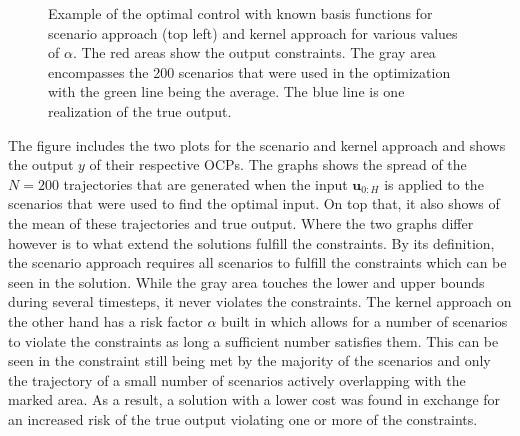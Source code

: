 \begin{figure}[htb]
{		\centering
 } 


\caption{Example of the optimal control with known basis functions for scenario approach (top left) and kernel approach for various values of $\alpha$. The red areas show the output constraints. The gray area encompasses the 200 scenarios that were used in the optimization with the green line being the average. The blue line is one realization of the true output.}
\label{ScenarioKernelComparison}
\end{figure}



The figure includes the two plots for the scenario and kernel approach and shows the output $y$ of their respective OCPs. The graphs shows the spread of the $N = 200$ trajectories that are generated when the input $\boldsymbol{u}_{0:H}$ is applied to the scenarios that were used to find the optimal input. On top that, it also shows of the mean of these trajectories and true output. Where the two graphs differ however is to what extend the solutions fulfill the constraints. By its definition, the scenario approach requires all scenarios to fulfill the constraints which can be seen in the solution. While the gray area touches the lower and upper bounds during several timesteps, it never violates the constraints. The kernel approach on the other hand has a risk factor $\alpha$ built in which allows for a number of scenarios to violate the constraints as long a sufficient number satisfies them. This can be seen in the constraint still being met by the majority of the scenarios and only the trajectory of a small number of scenarios actively overlapping with the marked area. As a result, a solution with a lower cost was found in exchange for an increased risk of the true output violating one or more of the constraints.




